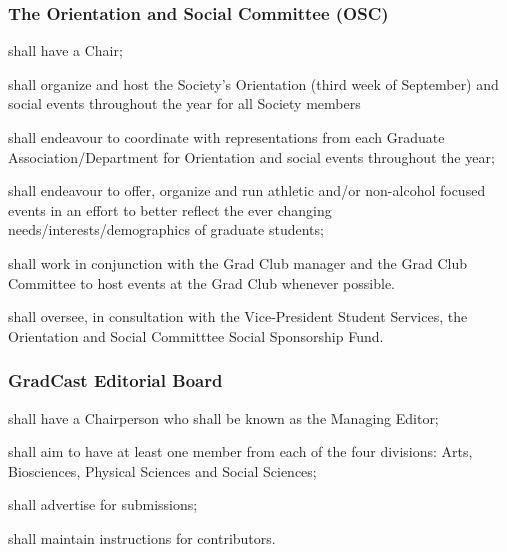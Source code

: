 \subsubsection{The Orientation and Social Committee (OSC)}
\begin{longenum}[ label*=\thesubsubsection.\arabic*., align=left]
	\item shall have a Chair;
    \item  shall organize and host the Society's Orientation (third week of September) and social events throughout the year for all Society members
    \item  shall endeavour to coordinate with representations from each Graduate 
    Association/Department for Orientation and social events throughout the year;
    \item  shall endeavour to offer, organize and run athletic and/or non-alcohol focused events in an effort to better reflect the ever changing needs/interests/demographics of graduate students; 
    \item shall work in conjunction with the Grad Club manager and the Grad Club Committee to host events at the Grad Club whenever possible.
    \item shall oversee, in consultation with the Vice-President Student Services, the Orientation and Social Committtee Social
Sponsorship Fund.

\end{longenum}
 
\subsubsection{GradCast  Editorial Board}
\begin{longenum}[ label*=\thesubsubsection.\arabic*., align=left]
	\item  shall have a Chairperson who shall be known as the Managing Editor;
    \item shall aim to have at least one member from each of the four divisions: Arts, Biosciences, Physical Sciences and Social Sciences;
    \item shall advertise for submissions;
    \item shall maintain instructions for contributors.
\end{longenum}
 
